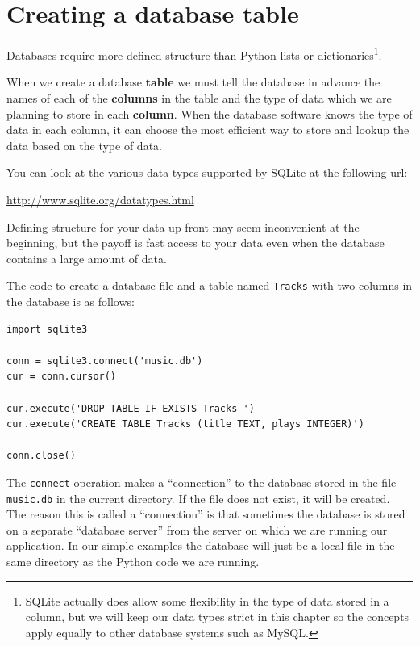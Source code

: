 \documentclass[10pt]{book}
\begin{document}
\section{Creating a database table}

Databases require more defined structure than Python lists 
or dictionaries\footnote{SQLite actually does allow some 
flexibility in the type of data stored in a column,
but we will keep our data types strict in this chapter
so the concepts apply equally to other database systems 
such as MySQL.}.  

When we create a database {\bf table} we
must tell the database in advance the names of each of the
{\bf columns} in the table and the type of data which we are 
planning to store in each {\bf column}.   When the database software
knows the type of data in each column, it can choose the most 
efficient way to store and lookup the data based on the type of
data. 

You can look at the various data types supported by SQLite
at the following url:

\url{http://www.sqlite.org/datatypes.html}

Defining structure for your data up front may seem inconvenient
at the beginning, but the payoff is fast access to your data 
even when the database contains a large amount of data.

The code to create a database file and a table 
named {\tt Tracks} with two columns in the 
database is as follows:

\beforeverb
\begin{verbatim}
import sqlite3

conn = sqlite3.connect('music.db')
cur = conn.cursor()

cur.execute('DROP TABLE IF EXISTS Tracks ')
cur.execute('CREATE TABLE Tracks (title TEXT, plays INTEGER)')

conn.close()
\end{verbatim}
\afterverb
%
The {\tt connect} operation makes a ``connection'' to the database 
stored in the file {\tt music.db} in the current directory.   If
the file does not exist, it will be created.  The reason this
is called a ``connection'' is that sometimes the database is stored
on a separate ``database server'' from the server on which we 
are running our application.  In our simple examples 
the database will just be a local file in the same directory
as the Python code we are running.
\end{document}
